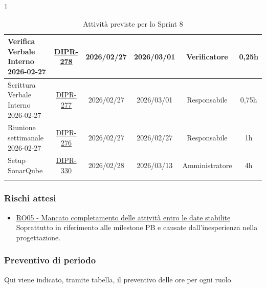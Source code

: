 \documentclass[a4paper,12pt]{article}
\begin{document}
\begin{spacing}{1}
\begin{longtable}{|p{4cm}|c|c|c|c|c|}
        \hline
        Verifica Verbale Interno 2026-02-27 & \href{https://7zpus.atlassian.net/browse/DIPR-278}{DIPR-278} & 2026/02/27 & 2026/03/01 & Verificatore & 0,25h \\
        \hline
        Scrittura Verbale Interno 2026-02-27 & \href{https://7zpus.atlassian.net/browse/DIPR-277}{DIPR-277} & 2026/02/27 & 2026/03/01 & Responsabile & 0,75h \\
        \hline
        Riunione settimanale 2026-02-27 & \href{https://7zpus.atlassian.net/browse/DIPR-276}{DIPR-276} & 2026/02/27 & 2026/02/27 & Responsabile & 1h \\
        \hline
        Setup SonarQube & \href{https://7zpus.atlassian.net/browse/DIPR-330}{DIPR-330} & 2026/02/28 & 2026/03/13 & Amministratore & 4h \\
        \hline
        \rowcolor{white}
        \caption{Attività previste per lo Sprint 8}
    \end{longtable}
    \end{spacing}

\subsubsection{Rischi attesi}
\begin{itemize}
    \item \hyperref[RO05]{RO05 - Mancato completamento delle attività entro le date stabilite} \\Soprattutto in riferimento alle milestone PB e causate dall'inesperienza nella progettazione.
\end{itemize}

\subsubsection{Preventivo di periodo}
Qui viene indicato, tramite tabella, il preventivo delle ore per ogni ruolo.
\end{document}
